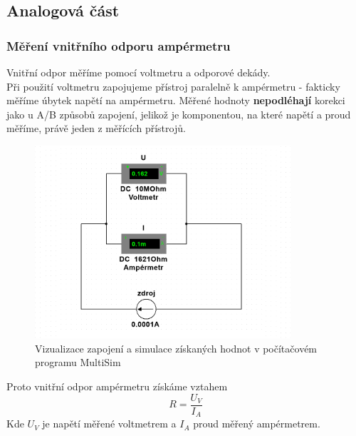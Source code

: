 \documentclass[czech,11pt,a4paper]{article}
\begin{document}
	
	
	
	\subsection{Analogová část}
		\subsubsection{Měření vnitřního odporu ampérmetru}
		Vnitřní odpor měříme pomocí voltmetru a odporové dekády.\\
		Při použití voltmetru zapojujeme přístroj paralelně k ampérmetru - fakticky měříme úbytek napětí na ampérmetru. Měřené hodnoty \textbf{nepodléhají} korekci jako u A/B způsobů zapojení, jelikož je komponentou, na které napětí a proud měříme, právě jeden z měřících přístrojů.

			\begin{figure}[H]
			\begin{center}
							\includegraphics[width=0.85\textwidth,]{Odpor pres Voltmetr}
							\caption {Vizualizace zapojení a simulace získaných hodnot v počítačovém programu MultiSim}
							
			\end{center}
		\end{figure}
		Proto vnitřní odpor ampérmetru získáme vztahem
		\begin{equation}
			R = \frac{U_V}{I_A}
		\end{equation}
		Kde $U_V$ je napětí měřené voltmetrem a $I_A$ proud měřený ampérmetrem.
		
\end{document}
